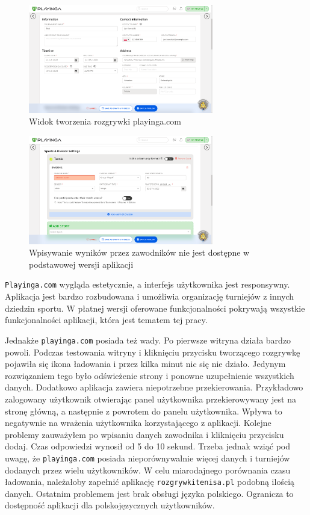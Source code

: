 \documentclass[shortabstract]{iithesis}
\begin{document}
\begin{figure}[H]
    \centering
    \includegraphics[width=0.72\textwidth,valign=t]{assets/alt_rozw/playinga_tworzenie.png}
    \caption{Widok tworzenia rozgrywki playinga.com}
    \label{fig:playinga_creating_tournament}
\end{figure}
\begin{figure}[H]
    \centering
    \includegraphics[width=0.72\textwidth,valign=t]{assets/alt_rozw/playinga_tworzenie2.png}
    \caption{Wpisywanie wyników przez zawodników nie jest dostępne w podstawowej wersji aplikacji}
    \label{fig:playinga_paid_version}
\end{figure}
\texttt{Playinga.com} wygląda estetycznie, a interfejs użytkownika jest responsywny. Aplikacja jest bardzo rozbudowana i umożliwia organizację turniejów z innych dziedzin sportu.
W płatnej wersji oferowane funkcjonalności pokrywają wszystkie funkcjonalności aplikacji, która jest tematem tej pracy.
\par
Jednakże \texttt{playinga.com} posiada też wady.
Po pierwsze witryna działa bardzo powoli.
Podczas testowania witryny i kliknięciu przycisku tworzącego rozgrywkę pojawiła się ikona ładowania i przez kilka minut nic się nie działo.
Jedynym rozwiązaniem tego było odświeżenie strony i ponowne uzupełnienie wszystkich danych.
Dodatkowo aplikacja zawiera niepotrzebne przekierowania.
Przykładowo zalogowany użytkownik otwierając panel użytkownika przekierowywany jest na stronę główną, a następnie z powrotem do panelu użytkownika.
Wpływa to negatywnie na wrażenia użytkownika korzystającego z aplikacji.
Kolejne problemy zauważyłem po wpisaniu danych zawodnika i kliknięciu przycisku dodaj.
Czas odpowiedzi wynosił od 5 do 10 sekund. Trzeba jednak wziąć pod uwagę, że \texttt{playinga.com} posiada nieporównywalnie więcej danych i turniejów dodanych przez wielu użytkowników.
W celu miarodajnego porównania czasu ładowania, należałoby zapełnić aplikację \texttt{rozgrywkitenisa.pl} podobną ilością danych.
Ostatnim problemem jest brak obsługi języka polskiego. Ogranicza to dostępność aplikacji dla polskojęzycznych użytkowników.
\end{document}
